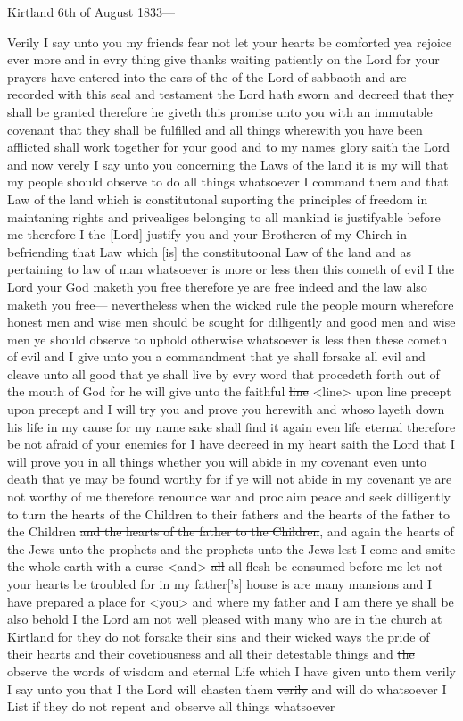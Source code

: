 				\begin{tightcenter}
				Kirtland 6th of August 1833---
				\end{tightcenter}
				
				Verily I say unto you my friends fear not let your hearts be comforted yea rejoice ever more and in evry thing give thanks waiting patiently on the Lord for your prayers have entered into the ears of the of the Lord of sabbaoth and are recorded with this seal and testament the Lord hath sworn and decreed that they shall be granted therefore he giveth this promise unto you with an immutable covenant that they shall be fulfilled and all things wherewith you have been afflicted shall work together for your good and to my names glory saith the Lord and now verely I say unto you concerning the Laws of the land it is my will that my people should observe to do all things whatsoever I command them and that Law of the land which is constitutonal suporting the principles of freedom in maintaning rights and privealiges belonging to all mankind is justifyable before me therefore I the [Lord] justify you and your Brotheren of my Chirch in befriending that Law which [is] the constitutoonal Law of the land and as pertaining to law of man whatsoever is more or less then this cometh of evil I the Lord your God maketh you free therefore ye are free indeed and the law also maketh you free--- nevertheless when the wicked rule the people mourn wherefore honest men and wise men should be sought for dilligently and good men and wise men ye should observe to uphold otherwise whatsoever is less then these cometh of evil and I give unto you a commandment that ye shall forsake all evil and cleave unto all good that ye shall live by evry word that procedeth forth out of the mouth of God for he will give unto the faithful \sout{line} <line> upon line precept upon precept and I will try you and prove you herewith and whoso layeth down his life in my cause for my name sake shall find it again even life eternal therefore be not afraid of your enemies for I have decreed in my heart saith the Lord that I will prove you in all things whether you will abide in my covenant even unto death that ye may be found worthy for if ye will not abide in my covenant ye are not worthy of me therefore renounce war and proclaim peace and seek dilligently to turn the hearts of the Children to their fathers and the hearts of the father to the Children \sout{and the hearts of the father to the Children}, and again the hearts of the Jews unto the prophets and the prophets unto the Jews lest I come and smite the whole earth with a curse <and> \sout{all} all flesh be consumed before me let not your hearts be troubled for in my father['s] house \sout{is} are many mansions and I have prepared a place for <you> and where my father and I am there ye shall be also behold I the Lord am not well pleased with many who are in the church at Kirtland for they do not forsake their sins and their wicked ways the pride of their hearts and their covetiousness and all their detestable things and \sout{the} observe the words of wisdom and eternal Life which I have given unto them verily I say unto you that I the Lord will chasten them \sout{verily} and will do whatsoever I List if they do not repent and observe all things whatsoever 
